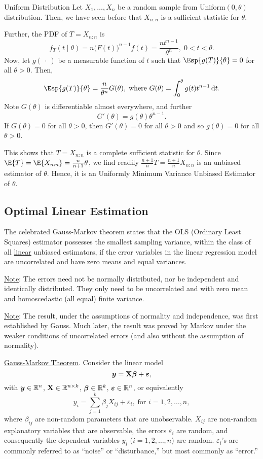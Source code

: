 \begin{Example}{Uniform Distribution}{}
    Let $ X_1,\ldots,X_n $ be a random sample from $ \text{Uniform}(0,\theta) $
    distribution. Then, we have seen before that $ X_{n:n} $ is a sufficient statistic for $ \theta $.

    Further, the PDF of $ T=X_{n:n} $ is
    \[ f_T(t\mid \theta)=n\bigl(F(t)\bigr)^{n-1}f(t)=\frac{nt^{n-1}}{\theta^n},\; 0<t<\theta. \]
    Now, let $ g(\:\cdot\:) $ be a measurable function of $ t $ such that $ \Esp{g(T)}{\theta}=0 $
    for all $ \theta>0 $. Then,
    \[ \Esp{g(T)}{\theta}=\frac{n}{\theta^n}G(\theta),\; \text{where }G(\theta)=\int_{0}^\theta g(t)t^{n-1}\odif{t}. \]
    Note $ G(\theta) $ is differentiable almost everywhere, and further
    \[ G'(\theta)=g(\theta)\theta^{n-1}. \]
    If $ G(\theta)=0 $ for all $ \theta>0 $, then $ G'(\theta)=0 $
    for all $ \theta>0 $ and so $ g(\theta)=0 $ for all $ \theta>0 $.

    This shows that $ T=X_{n:n} $ is a complete sufficient statistic for
    $ \theta $. Since $ \E{T}=\E{X_{n:n}}=\frac{n}{n+1}\theta $,
    we find readily $ \frac{n+1}{n}T=\frac{n+1}{n}X_{n:n} $
    is an unbiased estimator of $ \theta $. Hence,
    it is an Uniformly Minimum Variance Unbiased Estimator of $ \theta $.
\end{Example}
\subsection*{Optimal Linear Estimation}
The celebrated Gauss-Markov theorem states that the
OLS (Ordinary Least Squares) estimator possesses
the smallest sampling variance, within the class of all \underline{linear}
unbiased estimators, if the error variables in the linear regression
model are uncorrelated and have zero means and equal variances.

\underline{Note}: The errors need not be normally distributed, nor be independent
and identically distributed. They only need to be uncorrelated and with zero mean
and homoscedastic (all equal) finite variance.

\underline{Note}: The result, under the assumptions
of normality and independence, was
first established by Gauss.
Much later, the result was proved by Markov under the weaker conditions
of uncorrelated errors (and also without the assumption of normality).

\underline{Gauss-Markov Theorem}. Consider
the linear model
\[ {\boldsymbol y}=\mathbf{X}{\boldsymbol \beta}+{\boldsymbol \varepsilon}, \]
with $ {\boldsymbol y}\in\mathbb{R}^n $, $ \mathbf{X}\in\mathbb{R}^{n\times k} $,
$ {\boldsymbol \beta}\in\mathbb{R}^k $, $ {\boldsymbol \varepsilon}\in\mathbb{R}^n $,
or equivalently
\[ y_i=\sum_{j=1}^{k}\beta_j X_{ij}+\varepsilon_i,\;\text{for }i=1,2,\ldots,n, \]
where $ \beta_{ij} $ are non-random parameters that are unobservable.
$ X_{ij} $ are non-random explanatory variables that
are observable, the errors $ \varepsilon_i $ are random,
and consequently the dependent variables $ y_i $ ($ i=1,2,\ldots,n $)
are random. $ \varepsilon_i $'s are commonly referred
to as ``noise'' or ``disturbance,'' but
most commonly as ``error.''


